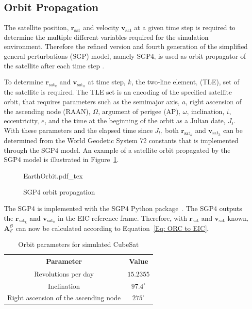 \subsection{Orbit Propagation}
The satellite position, $\mathbf{r}_{\text{sat}}$ and velocity $\mathbf{v}_{\text{sat}}$ at a given time step is required to determine the multiple different variables required for the simulation environment. Therefore the refined version and fourth generation of the simplified general perturbations (SGP) model, namely SGP4, is used as orbit propagator of the satellite after each time step \cite{vallado2006revisiting}. 

To determine $\mathbf{r}_{\text{sat}_k}$ and $\mathbf{v}_{\text{sat}_k}$ at time step, $k$, the two-line element, (TLE), set of the satellite is required. The TLE set is an encoding of the specified satellite orbit, that requires parameters such as the semimajor axis, $a$, right ascension of the ascending node (RAAN), $\Omega$, argument of perigee (AP), $\omega$, inclination, $i$, eccentricity, $e$, and the time at the beginning of the orbit as a Julian date, $J_t$. With these parameters and the elapsed time since $J_t$, both $\mathbf{r}_{\text{sat}_k}$ and $\mathbf{v}_{\text{sat}_k}$ can be determined from the World Geodetic System 72 constants that is implemented through the SGP4 model. An example of a satellite orbit propagated by the SGP4 model is illustrated in Figure~\ref{fig:EarthOrbit}.

\begin{figure}[!htb]
	\centering
	\def\svgwidth{10cm}
	{EarthOrbit.pdf_tex}
	\caption{SGP4 orbit propagation}
	\label{fig:EarthOrbit}
\end{figure}


The SGP4 is implemented with the SGP4 Python package~\cite{sgp4}. The SGP4 outputs the $\mathbf{r}_{\text{sat}_k}$ and $\mathbf{v}_{\text{sat}_k}$ in the EIC reference frame. Therefore, with $\mathbf{r}_{\text{sat}}$ and $\mathbf{v}_{\text{sat}}$ known, $\boldsymbol{A}^{\mathcal{O}}_{\mathcal{E}}$ can now be calculated according to Equation~\ref{Eq: ORC to EIC}.

\begin{table}[h!t!b]
	\centering
	\caption{\label{Table:OrbitParameters}Orbit parameters for simulated CubeSat}
	\begin{tabular}{c c }
		\hline\hline
		Parameter & Value \\ \hline
		Revolutions per day          & $15.2355$                    \\ 
		Inclination          & $97.4^\circ$                    \\ 
		Right ascension of the ascending node & $275^\circ$ \\
		\hline\hline
	\end{tabular}
\end{table}

